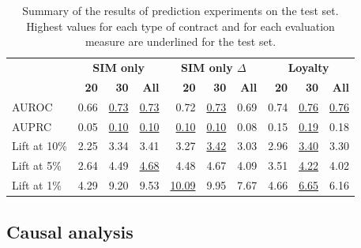 \begin{table}
    \centering
    \begin{tabular}{lrrrrrrrrr}
        \toprule
        & \multicolumn{3}{c}{\textbf{SIM only}}
        & \multicolumn{3}{c}{\textbf{SIM only $\Delta$}}
        & \multicolumn{3}{c}{\textbf{Loyalty}} \\
        \cmidrule(l){2-4} \cmidrule(l){5-7} \cmidrule(l){8-10}
        & \textbf{20} & \textbf{30} & \textbf{All} & \textbf{20} & \textbf{30} &
        \textbf{All} & \textbf{20} & \textbf{30} & \textbf{All} \\
        \midrule

        AUROC        & 0.66 & \underline{0.73} & \underline{0.73} & 0.72 &
        \underline{0.73} & 0.69 & 0.74 & \underline{0.76} & \underline{0.76} \\

        AUPRC        & 0.05 & \underline{0.10} & \underline{0.10} &
        \underline{0.10} & \underline{0.10} & 0.08 & 0.15 & \underline{0.19} & 0.18 \\

        Lift at 10\% & 2.25 & 3.34 & 3.41 & 3.27 & \underline{3.42} & 3.03 &
        2.96 & \underline{3.40} & 3.30 \\

        Lift at 5\%  & 2.64 & 4.49 & \underline{4.68} & 4.48 & 4.67 & 4.09 &
        3.51 & \underline{4.22} & 4.02 \\

        Lift at 1\%  & 4.29 & 9.20 & 9.53 & \underline{10.09} & 9.95 & 7.67 &
        4.66 & \underline{6.65} & 6.16 \\
        \bottomrule
    \end{tabular}
    \caption{Summary of the results of prediction experiments on the test set.
    Highest values for each type of contract and for each evaluation measure are
    underlined for the test set.}
    \label{tab:results_conclusion}
\end{table}

\subsection{Causal analysis}

